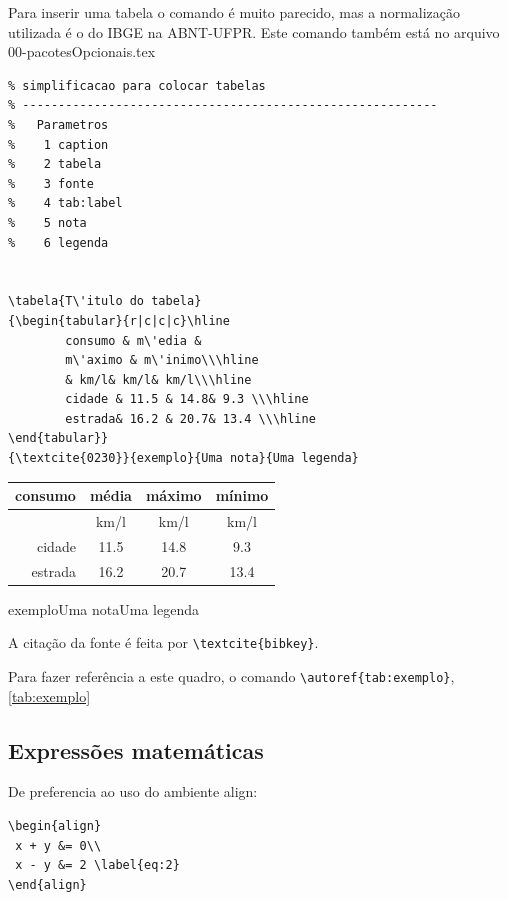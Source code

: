 Para inserir uma tabela o comando é muito parecido, mas a normalização utilizada é o do IBGE na ABNT-UFPR.
Este comando também está no arquivo 00-pacotesOpcionais.tex

\begin{lstlisting}
% simplificacao para colocar tabelas
% ----------------------------------------------------------
%   Parametros
%    1 caption
%    2 tabela
%    3 fonte
%    4 tab:label
%    5 nota
%    6 legenda


\tabela{T\'itulo do tabela}
{\begin{tabular}{r|c|c|c}\hline
		consumo & m\'edia & 
		m\'aximo & m\'inimo\\\hline
		& km/l& km/l& km/l\\\hline
		cidade & 11.5 & 14.8& 9.3 \\\hline
		estrada& 16.2 & 20.7& 13.4 \\\hline
\end{tabular}}
{\textcite{0230}}{exemplo}{Uma nota}{Uma legenda}
\end{lstlisting}


{\begin{tabular}{r|c|c|c}\hline
		consumo & m\'edia & 
		m\'aximo & m\'inimo\\\hline
		& km/l& km/l& km/l\\\hline
		cidade & 11.5 & 14.8& 9.3 \\\hline
		estrada& 16.2 & 20.7& 13.4 \\\hline
\end{tabular}}
{\textcite{ibge1993}}{exemplo}{Uma nota}{Uma legenda}


A citação da fonte é feita por \verb+\textcite{bibkey}+.

Para fazer referência a este quadro, o comando \verb+\autoref{tab:exemplo}+, \autoref{tab:exemplo}


\subsection[Equações]{Expressões matemáticas}

De preferencia ao uso do ambiente align:

\begin{lstlisting}
\begin{align}
 x + y &= 0\\
 x - y &= 2 \label{eq:2}
\end{align}
\end{lstlisting}


